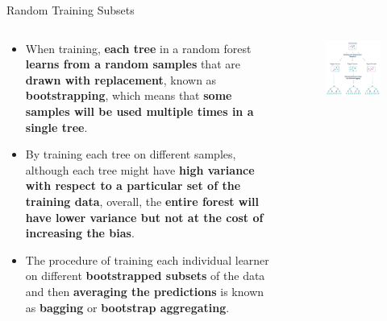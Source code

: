 \documentclass[document.tex]{subfiles}
\begin{document}
    \begin{frame}{Random Training Subsets}
        \begin{columns}
            \begin{column}{0.6\textwidth}
                \begin{itemize}
                    \item When training, \textbf{each tree} in a random forest \textbf{learns from a random samples} that are \textbf{drawn with replacement}, known as \textbf{bootstrapping}, which means that \textbf{some samples will be used multiple times in a single tree}.
                    \item By training each tree on different samples, although each tree might have \textbf{high variance with respect to a particular set of the training data}, overall, the \textbf{entire forest will have lower variance but not at the cost of increasing the bias}.
                    \item The procedure of training each individual learner on different \textbf{bootstrapped subsets} of the data and then \textbf{averaging the predictions} is known as \textbf{bagging} or \textbf{bootstrap aggregating}.
                \end{itemize}
            \end{column}
            \begin{column}{0.4\textwidth}
                \begin{figure}
                    \label{fig:random-forest-1}
                    \includegraphics[width=\textwidth, cframe=gray]{figures/external/random-forest-2.png}
                \end{figure}
            \end{column}
        \end{columns}
    \end{frame}
    
\end{document}
